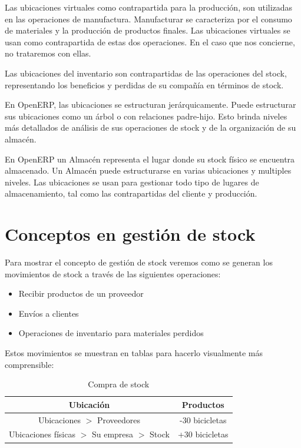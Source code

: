 Las ubicaciones virtuales como contrapartida para la producción, son utilizadas en las operaciones de manufactura. Manufacturar se caracteriza por el consumo de materiales y la producción de productos finales. Las ubicaciones virtuales se usan como contrapartida de estas dos operaciones. En el caso que nos concierne, no trataremos con ellas.


Las ubicaciones del inventario son contrapartidas de las operaciones del stock, representando los beneficios y perdidas de su compañía en términos de stock.

En OpenERP, las ubicaciones se estructuran jerárquicamente. Puede estructurar sus ubicaciones como un árbol o con relaciones padre-hijo. Esto brinda niveles más detallados de análisis de sus operaciones de stock y de la organización de su almacén.

En OpenERP un Almacén representa el lugar donde su stock físico se encuentra almacenado. Un Almacén puede estructurarse en varias ubicaciones y multiples niveles. Las ubicaciones se usan para gestionar todo tipo de lugares de almacenamiento, tal como las contrapartidas del cliente y producción.



\section{Conceptos en gestión de stock}
Para mostrar el concepto de gestión de stock veremos como se generan los movimientos de stock a través de las siguientes operaciones:

\begin{itemize}
\item Recibir productos de un proveedor
\item Envíos a clientes
\item Operaciones de inventario para materiales perdidos
\end{itemize}

Estos movimientos se muestran en tablas para hacerlo visualmente más comprensible:

\begin{table}[!th]
\begin{center}
\begin{tabular}{|c|c|}
  \hline
  Ubicación & Productos \\
  \hline
  Ubicaciones $>$ Proveedores & -30 bicicletas \\
  \hline
  Ubicaciones físicas $>$ Su empresa $>$ Stock & +30 bicicletas \\
  \hline
  
\end{tabular}
\end{center}
\caption{Compra de stock}
\label{al:compra}
\end{table}

